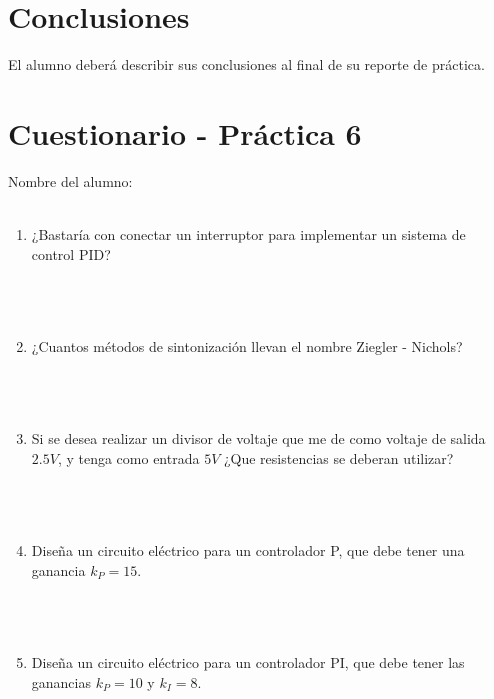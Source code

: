 \section{Conclusiones}

	El alumno deberá describir sus conclusiones al final de su reporte de práctica.


\clearpage
\section{Cuestionario - Práctica 6}
	Nombre del alumno: \\[0.2cm]
	\horrule{0.5pt} \\[0.2cm] %

	\begin{enumerate}
		\item ¿Bastaría con conectar un interruptor para implementar un sistema de control PID? \\ \\ \\ \\
		\item ¿Cuantos métodos de sintonización llevan el nombre Ziegler - Nichols? \\ \\ \\ \\
		\item Si se desea realizar un divisor de voltaje que me de como voltaje de salida $2.5 V$, y tenga como entrada $5 V$ ¿Que resistencias se deberan utilizar? \\ \\ \\ \\
		\item Diseña un circuito eléctrico para un controlador P, que debe tener una ganancia $k_P = 15$. \\ \\ \\ \\
		\item Diseña un circuito eléctrico para un controlador PI, que debe tener las ganancias $k_P = 10$ y $k_I = 8$. \\
	\end{enumerate}


